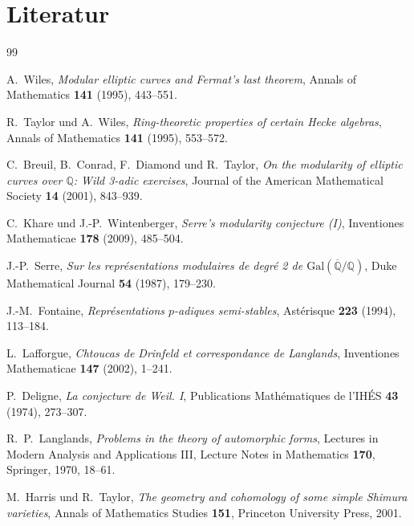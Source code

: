 \documentclass[a4paper,12pt]{amsart}
\theoremstyle{definition}
\theoremstyle{remark}
\begin{document}
\section{Literatur}

\begin{thebibliography}{99}

A.~Wiles,
\textit{Modular elliptic curves and Fermat's last theorem},
Annals of Mathematics \textbf{141} (1995), 443--551.

R.~Taylor und A.~Wiles,
\textit{Ring-theoretic properties of certain Hecke algebras},
Annals of Mathematics \textbf{141} (1995), 553--572.

C.~Breuil, B.~Conrad, F.~Diamond und R.~Taylor,
\textit{On the modularity of elliptic curves over $\mathbb{Q}$: Wild 3-adic exercises},
Journal of the American Mathematical Society \textbf{14} (2001), 843--939.

C.~Khare und J.-P.~Wintenberger,
\textit{Serre's modularity conjecture (I)},
Inventiones Mathematicae \textbf{178} (2009), 485--504.

J.-P.~Serre,
\textit{Sur les représentations modulaires de degré 2 de $\mathrm{Gal}(\overline{\mathbb{Q}}/\mathbb{Q})$},
Duke Mathematical Journal \textbf{54} (1987), 179--230.

J.-M.~Fontaine,
\textit{Représentations $p$-adiques semi-stables},
Astérisque \textbf{223} (1994), 113--184.

L.~Lafforgue,
\textit{Chtoucas de Drinfeld et correspondance de Langlands},
Inventiones Mathematicae \textbf{147} (2002), 1--241.

P.~Deligne,
\textit{La conjecture de Weil. I},
Publications Mathématiques de l'IHÉS \textbf{43} (1974), 273--307.

R.~P.~Langlands,
\textit{Problems in the theory of automorphic forms},
Lectures in Modern Analysis and Applications III,
Lecture Notes in Mathematics \textbf{170}, Springer, 1970, 18--61.

M.~Harris und R.~Taylor,
\textit{The geometry and cohomology of some simple Shimura varieties},
Annals of Mathematics Studies \textbf{151}, Princeton University Press, 2001.

\end{thebibliography}
\end{document}
